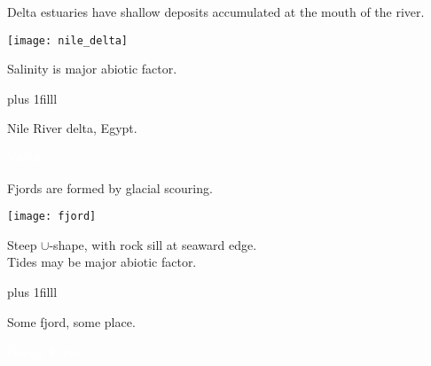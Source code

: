 \documentclass[t]{beamer}
\begin{document}
%
\begin{frame}[t]{Delta estuaries have shallow deposits accumulated at the mouth of the river.}
	
	\vspace*{-\baselineskip}
	
	\begin{multicols}{2}
		\begin{center}
			\texttt{[image: nile\_delta]}
		\end{center}
	\columnbreak
	
		
		\hangpara Salinity is major abiotic factor.
		
	\end{multicols}

	\vskip0pt plus 1filll

	\tiny Nile River delta, Egypt.
\end{frame}
%
%
{
\begin{frame}[b]{}
\tiny\textcolor{white}{NASA.}
\end{frame}
}
%
%
\begin{frame}[t]{Fjords are formed by glacial scouring.}
	
	\vspace*{-\baselineskip}
	
	\begin{center}
		\texttt{[image: fjord]}
	\end{center}

	\vspace*{-\baselineskip}
	
	\hspace*{4em} Steep $\cup$-shape, with rock sill at seaward edge.\\
	\hspace*{4em} Tides may be major abiotic factor.


	\vskip0pt plus 1filll

	\hfill\tiny Some fjord, some place.
\end{frame}
%
%
{
\begin{frame}[b]{}
\tiny\textcolor{white}{Google Earth}
\end{frame}
}
%
%
\end{document}
